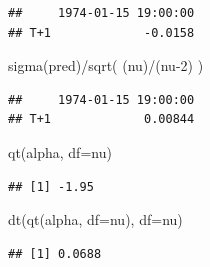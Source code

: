 \documentclass[
  oneside]{book}
\newenvironment{Shaded}{\begin{snugshade}}{\end{snugshade}}
\newcommand{\AttributeTok}[1]{\textcolor[rgb]{0.77,0.63,0.00}{#1}}
\newcommand{\DecValTok}[1]{\textcolor[rgb]{0.00,0.00,0.81}{#1}}
\newcommand{\FunctionTok}[1]{\textcolor[rgb]{0.00,0.00,0.00}{#1}}
\newcommand{\NormalTok}[1]{#1}
\newcommand{\OtherTok}[1]{\textcolor[rgb]{0.56,0.35,0.01}{#1}}
\newcommand{\SpecialCharTok}[1]{\textcolor[rgb]{0.00,0.00,0.00}{#1}}
\newcommand{\StringTok}[1]{\textcolor[rgb]{0.31,0.60,0.02}{#1}}
\begin{document}
\begin{verbatim}
##     1974-01-15 19:00:00
## T+1             -0.0158
\end{verbatim}

\begin{Shaded}
\begin{Highlighting}[]
\FunctionTok{sigma}\NormalTok{(pred)}\SpecialCharTok{/}\FunctionTok{sqrt}\NormalTok{( (nu)}\SpecialCharTok{/}\NormalTok{(nu}\DecValTok{{-}2}\NormalTok{) )}
\end{Highlighting}
\end{Shaded}

\begin{verbatim}
##     1974-01-15 19:00:00
## T+1             0.00844
\end{verbatim}

\begin{Shaded}
\begin{Highlighting}[]
\FunctionTok{qt}\NormalTok{(alpha, }\AttributeTok{df=}\NormalTok{nu)}
\end{Highlighting}
\end{Shaded}

\begin{verbatim}
## [1] -1.95
\end{verbatim}

\begin{Shaded}
\begin{Highlighting}[]
\FunctionTok{dt}\NormalTok{(}\FunctionTok{qt}\NormalTok{(alpha, }\AttributeTok{df=}\NormalTok{nu), }\AttributeTok{df=}\NormalTok{nu)}
\end{Highlighting}
\end{Shaded}

\begin{verbatim}
## [1] 0.0688
\end{verbatim}

\begin{Shaded}
\end{Shaded}
\end{document}
